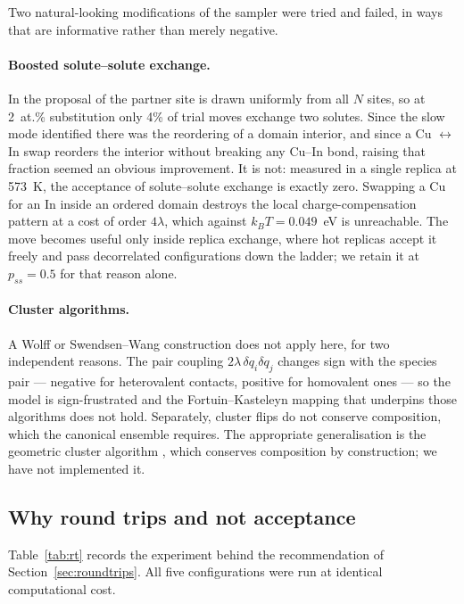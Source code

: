 \documentclass[11pt,a4paper]{article}
\begin{document}
Two natural-looking modifications of the sampler were tried and failed, in ways
that are informative rather than merely negative.

\paragraph{Boosted solute--solute exchange.} In the proposal of
\citet{yu2026} the partner site is drawn uniformly from all $N$ sites, so at
2~at.\% substitution only 4\% of trial moves exchange two solutes. Since the
slow mode identified there was the reordering of a domain interior, and since a
Cu $\leftrightarrow$ In swap reorders the interior without breaking any Cu--In
bond, raising that fraction seemed an obvious improvement. It is not: measured
in a single replica at 573~K, the acceptance of solute--solute exchange is
exactly zero. Swapping a Cu for an In inside an ordered domain destroys the
local charge-compensation pattern at a cost of order $4\lambda$, which against
$k_BT = 0.049$~eV is unreachable. The move becomes useful only inside replica
exchange, where hot replicas accept it freely and pass decorrelated
configurations down the ladder; we retain it at $p_{ss} = 0.5$ for that reason
alone.

\paragraph{Cluster algorithms.} A Wolff or Swendsen--Wang construction does not
apply here, for two independent reasons. The pair coupling
$2\lambda\,\delta q_i \delta q_j$ changes sign with the species pair --- negative
for heterovalent contacts, positive for homovalent ones --- so the model is
sign-frustrated and the Fortuin--Kasteleyn mapping that underpins those
algorithms does not hold. Separately, cluster flips do not conserve composition,
which the canonical ensemble requires. The appropriate generalisation is the
geometric cluster algorithm \citep{dress1995,liu2004}, which conserves
composition by construction; we have not implemented it.

\subsection{Why round trips and not acceptance}

Table~\ref{tab:rt} records the experiment behind the recommendation of
Section~\ref{sec:roundtrips}. All five configurations were run at identical
computational cost.
\end{document}
